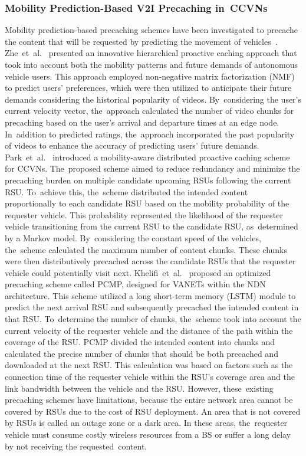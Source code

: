 \documentclass[sensors,aricle,accept,pdftex,moreauthors]{Definitions/mdpi}
\begin{document}
\subsubsection{Mobility Prediction-Based V2I Precaching in~CCVNs}
Mobility prediction-based precaching schemes have been investigated to precache the content that will be requested by predicting the movement of vehicles~\cite{Zhe2020, Park2019, Khelifi2018}.
Zhe~et~al.~\cite{Zhe2020} presented an innovative hierarchical proactive caching approach that took into account both the mobility patterns and future demands of autonomous vehicle users. This approach employed non-negative matrix factorization (NMF) to predict users' preferences, which were then utilized to anticipate their future demands considering the historical popularity of videos. By~considering the user's current velocity vector, the~approach calculated the number of video chunks for precaching based on the user's arrival and departure times at an edge node. In~addition to predicted ratings, the~approach incorporated the past popularity of videos to enhance the accuracy of predicting users' future demands.
Park~et~al.~\cite{Park2019} introduced a mobility-aware distributed proactive caching scheme for CCVNs. The~proposed scheme aimed to reduce redundancy and minimize the precaching burden on multiple candidate upcoming RSUs following the current RSU. To~achieve this, the~scheme distributed the intended content proportionally to each candidate RSU based on the mobility probability of the requester vehicle. This probability represented the likelihood of the requester vehicle transitioning from the current RSU to the candidate RSU, as~determined by a Markov model. By~considering the constant speed of the vehicles, the~scheme calculated the maximum number of content chunks. These chunks were then distributively precached across the candidate RSUs that the requester vehicle could potentially visit next.
Khelifi~et~al.~\cite{Khelifi2018} proposed an optimized precaching scheme called PCMP, designed for VANETs within the NDN architecture. This scheme utilized {a long short-term memory (LSTM)} module to predict the next arrival RSU and subsequently precached the intended content in that RSU. To~determine the number of chunks, the~scheme took into account the current velocity of the requester vehicle and the distance of the path within the coverage of the RSU. PCMP divided the intended content into chunks and calculated the precise number of chunks that should be both precached and downloaded at the next RSU. This calculation was based on factors such as the connection time of the requester vehicle within the RSU's coverage area and the link bandwidth between the vehicle and the RSU.
However, these~existing precaching schemes have limitations, because the entire network area cannot be covered by RSUs due to the cost of RSU deployment. 
An area that is not covered by RSUs is called an outage zone or a dark area.
In these areas, the~requester vehicle must consume costly wireless resources from a BS or suffer a long delay by not receiving the requested~content.
\end{document}
